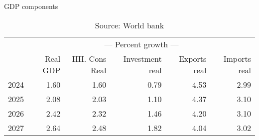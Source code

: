 \documentclass{article}
\begin{document}
\begin{table}[ht]
\caption{GDP components}
\begin{tabular}{lrrrrr}
\toprule
 & \multicolumn{5}{c}{---  Percent growth ---} \\
 & Real GDP & HH. Cons Real & Investment real & Exports real & Imports real \\
\midrule
2024 & 1.60 & 1.60 & 0.79 & 4.53 & 2.99 \\
2025 & 2.08 & 2.03 & 1.10 & 4.37 & 3.10 \\
2026 & 2.42 & 2.32 & 1.46 & 4.20 & 3.10 \\
2027 & 2.64 & 2.48 & 1.82 & 4.04 & 3.02 \\
\bottomrule
\end{tabular}
\caption*{Source: World bank }
\end{table}
\end{document}
